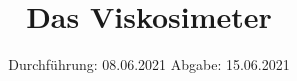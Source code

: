 

\subject{107}
\title{Das Viskosimeter}
\date{%
  Durchführung: 08.06.2021
  \hspace{3em}
  Abgabe: 15.06.2021
}



\maketitle
\thispagestyle{empty}
\tableofcontents
\newpage



%
%



\printbibliography{}


